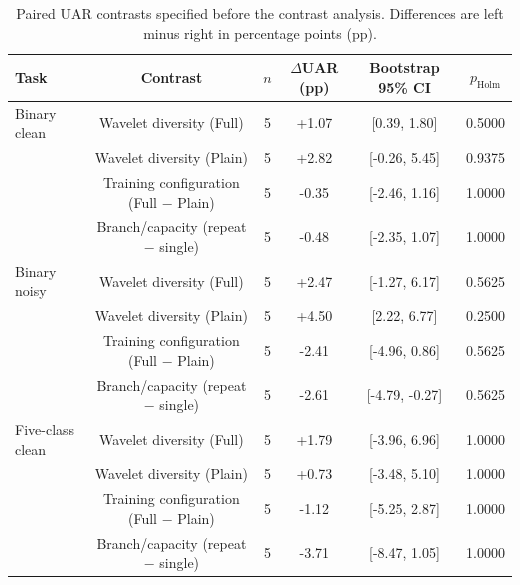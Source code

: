 \begin{table}[H]
\centering\color{black}
\caption{Paired UAR contrasts specified before the contrast analysis. Differences are left minus right in percentage points (pp).}\label{tab:supp_controlled_statistics}
\begingroup
\fontsize{8.0}{9.2}\selectfont
\setlength{\tabcolsep}{3pt}\renewcommand{\arraystretch}{1.03}
\begin{tabular*}{\linewidth}{@{\extracolsep{\fill}}lccccc@{}}\toprule
\textbf{Task} & \textbf{Contrast} & \textbf{$n$} & \textbf{$\Delta$UAR (pp)} & \textbf{Bootstrap 95\% CI} & \textbf{$p_{\mathrm{Holm}}$}\\\midrule
Binary clean & Wavelet diversity (Full) & 5 & +1.07 & [0.39, 1.80] & 0.5000\\
 & Wavelet diversity (Plain) & 5 & +2.82 & [-0.26, 5.45] & 0.9375\\
 & Training configuration (Full $-$ Plain) & 5 & -0.35 & [-2.46, 1.16] & 1.0000\\
 & Branch/capacity (repeat $-$ single) & 5 & -0.48 & [-2.35, 1.07] & 1.0000\\
\midrule
Binary noisy & Wavelet diversity (Full) & 5 & +2.47 & [-1.27, 6.17] & 0.5625\\
 & Wavelet diversity (Plain) & 5 & +4.50 & [2.22, 6.77] & 0.2500\\
 & Training configuration (Full $-$ Plain) & 5 & -2.41 & [-4.96, 0.86] & 0.5625\\
 & Branch/capacity (repeat $-$ single) & 5 & -2.61 & [-4.79, -0.27] & 0.5625\\
\midrule
Five-class clean & Wavelet diversity (Full) & 5 & +1.79 & [-3.96, 6.96] & 1.0000\\
 & Wavelet diversity (Plain) & 5 & +0.73 & [-3.48, 5.10] & 1.0000\\
 & Training configuration (Full $-$ Plain) & 5 & -1.12 & [-5.25, 2.87] & 1.0000\\
 & Branch/capacity (repeat $-$ single) & 5 & -3.71 & [-8.47, 1.05] & 1.0000\\
\bottomrule\end{tabular*}
\endgroup
{}
\end{table}

\begingroup\fontsize{9.5}{11.0}\selectfont

